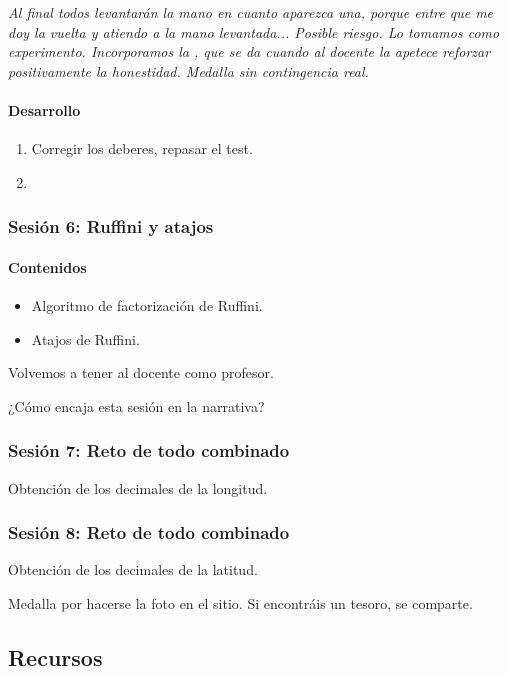 \textit{Al final todos levantarán la mano en cuanto aparezca una, porque entre que me doy la vuelta y atiendo a la mano levantada... Posible riesgo. Lo tomamos como experimento.
%
Incorporamos la , que se da cuando al docente la apetece reforzar positivamente la honestidad.
%
Medalla sin contingencia real.
}


\paragraph{Desarrollo}
\begin{enumerate}
	\item Corregir los deberes, repasar el test.
	\item 
\end{enumerate}

\subsubsection{Sesión 6: Ruffini y atajos}

\paragraph{Contenidos}
\begin{itemize}
	\item Algoritmo de factorización de Ruffini.
	\item Atajos de Ruffini.
\end{itemize}

Volvemos a tener al docente como profesor.

¿Cómo encaja esta sesión en la narrativa?

\subsubsection{Sesión 7: Reto de todo combinado}

Obtención de los decimales de la longitud.

\subsubsection{Sesión 8: Reto de todo combinado}

Obtención de los decimales de la latitud.

Medalla por hacerse la foto en el sitio.
%
Si encontráis un tesoro, se comparte.


\subsection{Recursos}

